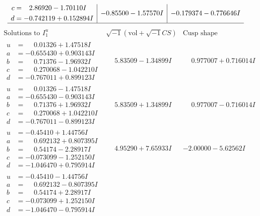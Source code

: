 \documentclass[1p]{elsarticle_modified}
\theoremstyle{definition}
\newcommand{\I}{\sqrt{-1}}
\begin{document}
$$\begin{array}{c|c|c}
\begin{aligned}
c &= \phantom{-}2.86920 - 1.70110 I \\
d &= -0.742119 + 0.152894 I\end{aligned}
 & -0.85500 - 1.57570 I & -0.179374 - 0.776646 I\\
 \hline 
 \end{array}$$\newpage$$\begin{array}{c|c|c}  
\text{Solutions to }I^u_{1}& \I (\text{vol} + \sqrt{-1}CS) & \text{Cusp shape}\\
 \hline 
\begin{aligned}
u &= \phantom{-}0.01326 + 1.47518 I \\
a &= -0.655430 + 0.903143 I \\
b &= \phantom{-}0.71376 - 1.96932 I \\
c &= \phantom{-}0.270068 - 1.042210 I \\
d &= -0.767011 + 0.899123 I\end{aligned}
 & \phantom{-}5.83509 - 1.34899 I & \phantom{-}0.977007 + 0.716014 I \\ \hline\begin{aligned}
u &= \phantom{-}0.01326 - 1.47518 I \\
a &= -0.655430 - 0.903143 I \\
b &= \phantom{-}0.71376 + 1.96932 I \\
c &= \phantom{-}0.270068 + 1.042210 I \\
d &= -0.767011 - 0.899123 I\end{aligned}
 & \phantom{-}5.83509 + 1.34899 I & \phantom{-}0.977007 - 0.716014 I \\ \hline\begin{aligned}
u &= -0.45410 + 1.44756 I \\
a &= \phantom{-}0.692132 + 0.807395 I \\
b &= \phantom{-}0.54174 - 2.28917 I \\
c &= -0.073099 - 1.252150 I \\
d &= -1.046470 + 0.795914 I\end{aligned}
 & \phantom{-}4.95290 + 7.65933 I & -2.00000 - 5.62562 I \\ \hline\begin{aligned}
u &= -0.45410 - 1.44756 I \\
a &= \phantom{-}0.692132 - 0.807395 I \\
b &= \phantom{-}0.54174 + 2.28917 I \\
c &= -0.073099 + 1.252150 I \\
d &= -1.046470 - 0.795914 I\end{aligned}

\end{array}$$
\end{document}
